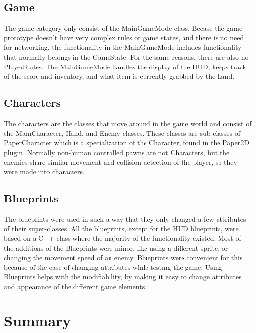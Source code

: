 \subsection{Game}
The game category only consist of the MainGameMode class. Becase the game prototype doesn't have very complex rules or game states, and there is no need for networking, the functionality in the MainGameMode includes functionality that normally belongs in the GameState. For the same reasons, there are also no PlayerStates. The MainGameMode handles the display of the HUD, keeps track of the score and inventory, and what item is currently grabbed by the hand.

\subsection{Characters}
The characters are the classes that move around in the game world and consist of the MainCharacter, Hand, and Enemy classes. These classes are sub-classes of PaperCharacter which is a specialization of the Character, found in the Paper2D plugin. Normally non-human controlled pawns are not Characters, but the enemies share similar movement and collision detection of the player, so they were made into characters.

\subsection{Blueprints}
The blueprints were used in such a way that they only changed a few attributes of their super-classes. All the blueprints, except for the HUD blueprints, were based on a C++ class where the majority of the functionality existed. Most of the additions of the Blueprints were minor, like using a different sprite, or changing the movement speed of an enemy. Blueprints were convenient for this because of the ease of changing attributes while testing the game. Using Blueprints helps with the modifiability, by making it easy to change attributes and appearance of the different game elements.


\section{Summary}
